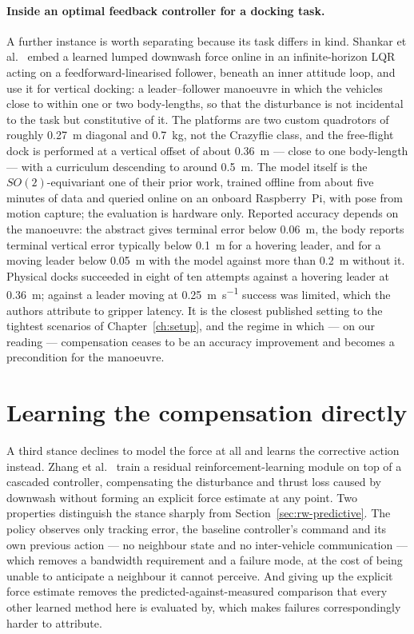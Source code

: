 \paragraph{Inside an optimal feedback controller for a docking task.}
A further instance is worth separating because its task differs in kind. Shankar et
al.~\cite{shankar2023docking} embed a learned lumped downwash force online in an infinite-horizon
LQR acting on a feedforward-linearised follower, beneath an inner attitude loop, and use it for
vertical docking: a leader--follower manoeuvre in which the vehicles close to within one or two
body-lengths, so that the disturbance is not incidental to the task but constitutive of it. The
platforms are two custom quadrotors of roughly \SI{0.27}{\metre} diagonal and \SI{0.7}{\kilo\gram},
not the Crazyflie class, and the free-flight dock is performed at a vertical offset of about
\SI{0.36}{\metre} --- close to one body-length --- with a curriculum descending to around
\SI{0.5}{\metre}. The model itself is the $SO(2)$-equivariant one of their prior work, trained
offline from about five minutes of data and queried online on an onboard Raspberry~Pi, with pose
from motion capture; the evaluation is hardware only. Reported accuracy depends on the manoeuvre:
the abstract gives terminal error below \SI{0.06}{\metre}, the body reports terminal vertical error
typically below \SI{0.1}{\metre} for a hovering leader, and for a moving leader below
\SI{0.05}{\metre} with the model against more than \SI{0.2}{\metre} without it. Physical docks
succeeded in eight of ten attempts against a hovering leader at \SI{0.36}{\metre}; against a leader
moving at \SI{0.25}{\metre\per\second} success was limited, which the authors attribute to gripper
latency. It is the closest published setting to the tightest
scenarios of Chapter~\ref{ch:setup}, and the regime in which --- on our reading ---
compensation ceases to be an accuracy improvement and becomes a precondition for the manoeuvre.

\section{Learning the compensation directly}
\label{sec:rw-rl}

A third stance declines to model the force at all and learns the corrective action instead. Zhang
et al.~\cite{zhang2024proxfly} train a residual reinforcement-learning module on top of a cascaded
controller, compensating the disturbance and thrust loss caused by downwash without forming an
explicit force estimate at any point. Two properties distinguish the stance sharply from
Section~\ref{sec:rw-predictive}. The policy observes only tracking error, the baseline controller's
command and its own previous action --- no neighbour state and no inter-vehicle communication ---
which removes a bandwidth requirement and a failure mode, at the cost of being unable to anticipate
a neighbour it cannot perceive. And giving up the explicit force estimate removes the
predicted-against-measured comparison that every other learned method here is evaluated by, which
makes failures correspondingly harder to attribute.

